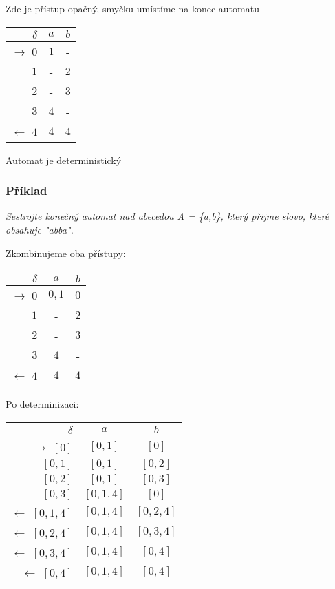 \documentclass{article}
\begin{document}
Zde je přístup opačný, smyčku umístíme na konec automatu

\begin{tabular}{|r||c|c|}
\hline
 $\delta$ &      $a$ &   $b$\\
\hline
\hline
$\rightarrow$ $0$ &     $1$ &   -\\
$1$ &   - &     $2$\\
$2$ &   - &     $3$\\
$3$ &   $4$ &   -\\
$\leftarrow$ $4$ &      $4$ &   $4$\\
\hline
\end{tabular}

Automat je deterministický

\subsubsection{Příklad}
\emph{
Sestrojte konečný automat nad abecedou A = \{a,b\}, který přijme slovo, které obsahuje "abba".
}

Zkombinujeme oba přístupy:

\begin{tabular}{|r||c|c|}
\hline
 $\delta$ &      $a$ &   $b$\\
\hline
\hline
$\rightarrow$ $0$ &     $0,1$ & $0$\\
$1$ &   - &     $2$\\
$2$ &   - &     $3$\\
$3$ &   $4$ &   -\\
$\leftarrow$ $4$ &      $4$ &   $4$\\
\hline
\end{tabular}

Po determinizaci:

\begin{tabular}{|r||c|c|}
\hline
 $\delta$ &      $a$ &   $b$\\
\hline
\hline
$\rightarrow$ $[0]$ &   $[0,1]$ &       $[0]$\\
$[0,1]$ &       $[0,1]$ &       $[0,2]$\\
$[0,2]$ &       $[0,1]$ &       $[0,3]$\\
$[0,3]$ &       $[0,1,4]$ &     $[0]$\\
$\leftarrow$ $[0,1,4]$ &        $[0,1,4]$ &     $[0,2,4]$\\
$\leftarrow$ $[0,2,4]$ &        $[0,1,4]$ &     $[0,3,4]$\\
$\leftarrow$ $[0,3,4]$ &        $[0,1,4]$ &     $[0,4]$\\
$\leftarrow$ $[0,4]$ &  $[0,1,4]$ &     $[0,4]$\\
\hline
\end{tabular}
\end{document}
